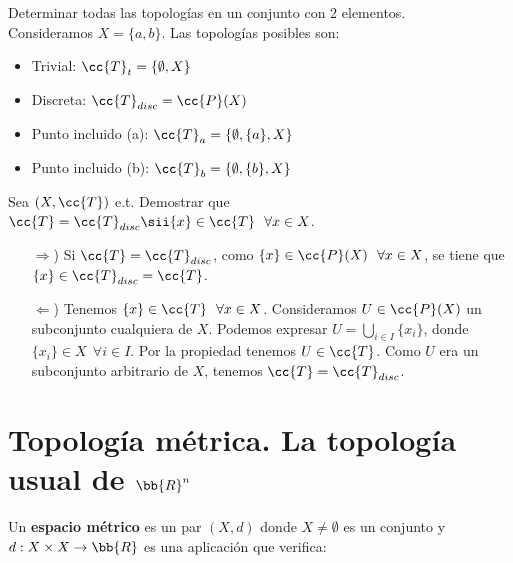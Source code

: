 \begin{ejemplo}
    \begin{ejercicio}
        Determinar todas las topologías en un conjunto con 2 elementos.\\

        Consideramos $X=\{a,b\}$. Las topologías posibles son:
        \begin{itemize}
            \item Trivial: $\cc{T}_t=\{\emptyset, X\}$
            \item Discreta: $\cc{T}_{disc}=\cc{P}(X)$
            \item Punto incluido (a): $\cc{T}_a = \{\emptyset, \{a\}, X\}$
            \item Punto incluido (b): $\cc{T}_b = \{\emptyset, \{b\}, X\}$
        \end{itemize}
        \endsquare
    \end{ejercicio}

    \begin{ejercicio}
        Sea $(X, \cc{T})$ e.t. Demostrar que $\cc{T}=\cc{T}_{disc} \sii \{x\}\in \cc{T}\ \  \forall x \in X$. 
        \begin{itemize}
            \item[$\Rightarrow$)] Si $\cc{T} = \cc{T}_{disc}$, como $\{x\}\in \cc{P}(X) \ \ \forall x \in X$, se tiene que $\{x\}\in \cc{T}_{disc} = \cc{T}$.
            \item[$\Leftarrow$)] Tenemos $\{x\} \in \cc{T} \ \ \forall x \in X$. Consideramos $U \in \cc{P}(X)$ un subconjunto cualquiera de $X$. Podemos expresar $U=\bigcup\limits_{i\in I} \{x_i\}$, donde $\{x_i\} \in X \ \ \forall i \in I$. Por la propiedad  tenemos $U \in \cc{T}$. Como $U$ era un subconjunto arbitrario de $X$, tenemos $\cc{T}=\cc{T}_{disc}$.
        \end{itemize}
        \endsquare
    \end{ejercicio}

    \section{Topología métrica. La topología usual de $\bb{R}^n$}

    \begin{definicion}
        Un \textbf{espacio métrico} es un par $(X, d)$ donde $X \neq \emptyset$ es un conjunto y $d: X \times X \rightarrow \bb{R}$ es una aplicación que verifica:
    \end{definicion}


\end{ejemplo}
